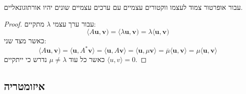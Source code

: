 \documentclass{tstextbook}
\begin{document}
\begin{proposition}
עבור אופרטור צמוד לעצמו ווקטורים עצמיים עם ערכים עצמיים שונים יהיו אורתוגונאליים.

\end{proposition}
\begin{proof}
עבור ערך עצמי \(\lambda\) מתקיים:
$$ \langle A\mathbf{u},\mathbf{v})=\langle\lambda\mathbf{u},\mathbf{v})=\lambda\langle\mathbf{u},\mathbf{v})$$
כאשר מצד שני:
$$\langle A\mathbf{u},\mathbf{v})=\langle\mathbf{u},A^{*}\mathbf{v} \rangle =\langle\mathbf{u},A\mathbf{v} \rangle =\langle\mathbf{u},\mu\mathbf{v} \rangle ={\overline{{\mu}}}\langle\mathbf{u},\mathbf{v} \rangle =\mu\langle\mathbf{u},\mathbf{v} \rangle $$
כאשר כל עוד \(\mu \neq \lambda\) נדרש כי ייתקיים \(\langle u,v \rangle=0\).

\end{proof}
\subsection{איזומטריה}
\end{document}
